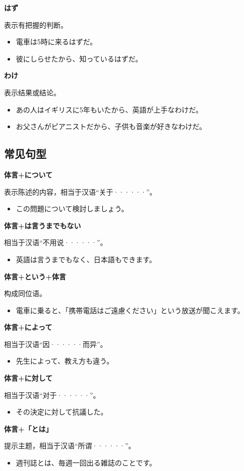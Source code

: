 {\bf
\noindent はず
}

表示有把握的判断。
\begin{itemize}
  \item 電車は5時に来るはずだ。
  \item 彼にしらせたから、知っているはずだ。
\end{itemize}

{\bf
\noindent わけ
}

表示结果或结论。
\begin{itemize}
  \item あの人はイギリスに5年もいたから、英語が上手なわけだ。
  \item お父さんがピアニストだから、子供も音楽が好きなわけだ。
\end{itemize}


\subsection{常见句型}%

{\bf
\noindent 体言+について
}

表示陈述的内容，相当于汉语``关于······''。
\begin{itemize}
  \item この問題について検討しましょう。
\end{itemize}


{\bf
\noindent 体言+は言うまでもない
}

相当于汉语``不用说······''。
\begin{itemize}
  \item 英語は言うまでもなく、日本語もできます。
\end{itemize}

{\bf
\noindent 体言+という+体言
}

构成同位语。
\begin{itemize}
  \item 電車に乗ると、「携帯電話はご遠慮ください」という放送が聞こえます。
\end{itemize}

{\bf
\noindent 体言+によって
}

相当于汉语``因······而异''。
\begin{itemize}
  \item 先生によって、教え方も違う。
\end{itemize}

{\bf
\noindent 体言+に対して
}

相当于汉语``对于······''。
\begin{itemize}
  \item その決定に対して抗議した。
\end{itemize}

{\bf
\noindent 体言+「とは」
}

提示主题，相当于汉语``所谓······''。
\begin{itemize}
  \item 週刊誌とは、毎週一回出る雑誌のことです。
\end{itemize}


